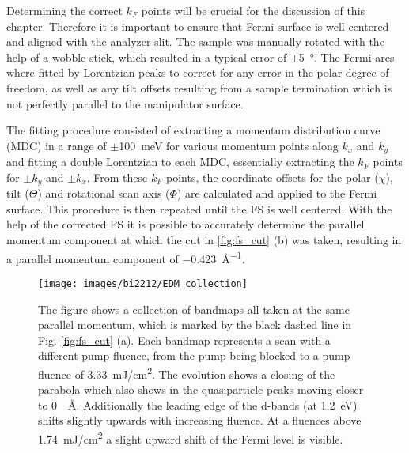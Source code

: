 Determining the correct $k_F$ points will be crucial for the discussion of this chapter.
Therefore it is important to ensure that Fermi surface is well centered and aligned with the analyzer slit.
The sample was manually rotated with the help of a wobble stick, which resulted in a typical error of $\pm$\qty{5}{\degree}.
The Fermi arcs where fitted by Lorentzian peaks to correct for any error in the polar degree of freedom, as well as any tilt offsets resulting from a sample termination which is not perfectly parallel to the manipulator surface.

The fitting procedure consisted of extracting a momentum distribution curve (MDC) in a range of $\pm$\qty{100}{\milli\electronvolt} for various momentum points along $k_x$ and $k_y$ and fitting a double Lorentzian to each MDC, essentially extracting the $k_F$ points for $\pm k_y$ and $\pm k_x$.
From these $k_F$ points, the coordinate offsets for the polar ($\chi$), tilt ($\Theta$) and rotational scan axis ($\Phi$) are calculated and applied to the Fermi surface.
This procedure is then repeated until the FS  is well centered.
With the help of the corrected FS it is possible to accurately determine the parallel momentum component at which the cut in \ref{fig:fs_cut} (b) was taken, resulting in a parallel momentum component of \qty{-0.423}{\angstrom^{-1}}.

\begin{figure}[th!]
	\centering
	\texttt{[image: images/bi2212/EDM\_collection]}
	\caption{The figure shows a collection of bandmaps all taken at the same parallel momentum, which is marked by the black dashed line in Fig. \ref{fig:fs_cut} (a). Each bandmap represents a scan with a different pump fluence, from the pump being blocked to a pump fluence of \qty{3.33}{\milli\joule/\centi\meter\squared}. The evolution shows a closing of the parabola which also shows in the quasiparticle peaks moving closer to \qty{0}{\per\angstrom}. Additionally the leading edge of the  d-bands (at \qty{1.2}{\electronvolt}) shifts slightly upwards with increasing fluence. At a fluences above \qty{1.74}{\milli\joule/\centi\meter\squared} a slight upward shift of the Fermi level is visible.}
	\label{fig:edm_collection}
\end{figure}

